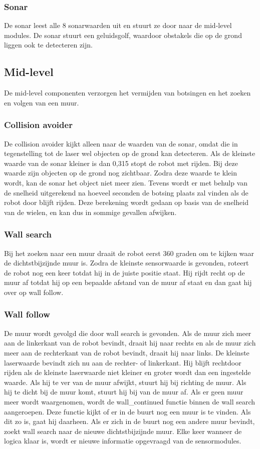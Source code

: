 \documentclass[a4paper,10pt]{article}
\begin{document}
\subsubsection{Sonar}
De sonar leest alle 8 sonarwaarden uit en stuurt ze door naar de mid-level modules. De sonar stuurt een geluidsgolf, waardoor obstakels die op de grond liggen ook te detecteren zijn.

\subsection{Mid-level}
De mid-level componenten verzorgen het vermijden van botsingen en het zoeken en volgen van een muur.

\subsubsection{Collision avoider}
De collision avoider kijkt alleen naar de waarden van de sonar, omdat die in tegenstelling tot de laser wel objecten op de grond kan detecteren. Als de kleinste waarde van de sonar kleiner is dan 0,315 stopt de robot met rijden. Bij deze waarde zijn objecten op de grond nog zichtbaar. Zodra deze waarde te klein wordt, kan de sonar het object niet meer zien. Tevens wordt er met behulp van de snelheid uitgerekend na hoeveel seconden de botsing plaats zal vinden als de robot door blijft rijden. Deze berekening wordt gedaan op basis van de snelheid van de wielen, en kan dus in sommige gevallen afwijken.

\subsubsection{Wall search}
Bij het zoeken naar een muur draait de robot eerst 360 graden om te kijken waar de dichtstbijzijnde muur is. Zodra de kleinste sensorwaarde is gevonden, roteert de robot nog een keer totdat hij in de juiste positie staat. Hij rijdt recht op de muur af totdat hij op een bepaalde afstand van de muur af staat en dan gaat hij over op wall follow.

\subsubsection{Wall follow}
De muur wordt gevolgd die door wall search is gevonden. Als de muur zich meer aan de linkerkant van de robot bevindt, draait hij naar rechts en als de muur zich meer aan de rechterkant van de robot bevindt, draait hij naar links. De kleinste laserwaarde bevindt zich nu aan de rechter- of linkerkant. Hij blijft rechtdoor rijden als de kleinste laserwaarde niet kleiner en groter wordt dan een ingestelde waarde. Als hij te ver van de muur afwijkt, stuurt hij bij richting de muur. Als hij te dicht bij de muur komt, stuurt hij bij van de muur af. Als er geen muur meer wordt waargenomen, wordt de wall\_continued functie binnen de wall search aangeroepen. Deze functie kijkt of er in de buurt nog een muur is te vinden. Als dit zo is, gaat hij daarheen. Als er zich in de buurt nog een andere muur bevindt, zoekt wall search naar de nieuwe dichtstbijzijnde muur. Elke keer wanneer de logica klaar is, wordt er nieuwe informatie opgevraagd van de sensormodules.
\end{document}
